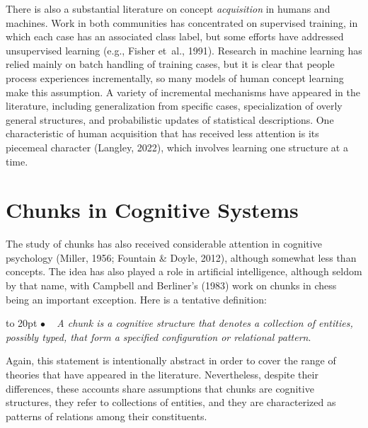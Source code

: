 \documentclass[11pt,letterpaper]{article}
\def\texitem#1{\par\noindent\hangindent 20pt
               \hbox to 20pt {\hss #1 ~}\ignorespaces}
\def\bull{\texitem{$\bullet$}}
\def\note#1{\vskip 0.15in\texitem{$\bullet$} #1 \vskip 0.15in}
\begin{document}


There is also a substantial literature on concept {\it acquisition\/} 
in humans and machines. 
Work in both communities has concentrated on supervised training, in
  which each case has an associated class label, but some efforts 
  have addressed unsupervised learning (e.g., Fisher et~al., 1991). 
Research in machine learning has relied mainly on batch handling 
  of training cases, but it is clear that people process experiences 
  incrementally, so many models of human concept learning make this 
  assumption. 
A variety of incremental mechanisms have appeared in the literature, 
  including generalization from specific cases, specialization of 
  overly general structures, and probabilistic updates of statistical 
  descriptions. 
One characteristic of human acquisition that has received less
  attention is its piecemeal character (Langley, 2022), which 
  involves learning one structure at a time. 


\section{Chunks in Cognitive Systems}


The study of chunks has also received considerable attention in cognitive
  psychology (Miller, 1956; Fountain \& Doyle, 2012), although somewhat 
  less than concepts. 
The idea has also played a role in artificial intelligence, although 
  seldom by that name, with Campbell and Berliner's (1983) work on
  chunks in chess being an important exception. 
Here is a tentative definition: 


\vskip 0.05in

\bull
  {\it A chunk is a cognitive structure that denotes a collection of 
       entities, possibly typed, that form a specified configuration 
       or relational pattern\/}. 

\vskip 0.05in
\noindent
Again, this statement is intentionally abstract in order to cover 
  the range of theories that have appeared in the literature. 
Nevertheless, despite their differences, these accounts share 
  assumptions that chunks are cognitive structures, they refer
  to collections of entities, and they are characterized as patterns 
  of relations among their constituents. 
\end{document}
